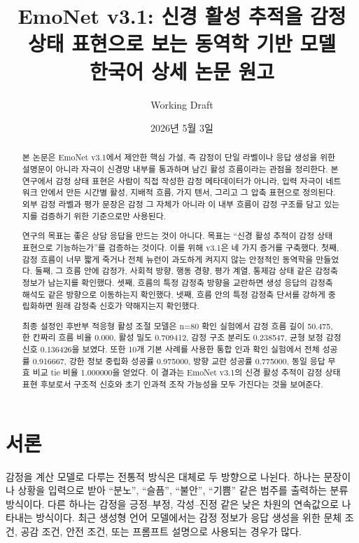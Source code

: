 \documentclass[11pt,a4paper]{article}
\title{\textbf{EmoNet v3.1: 신경 활성 추적을 감정 상태 표현으로 보는 동역학 기반 모델}\\
\large 한국어 상세 논문 원고}
\author{Working Draft}
\date{2026년 5월 3일}
\begin{document}
\maketitle

\begin{abstract}
본 논문은 EmoNet v3.1에서 제안한 핵심 가설, 즉 감정이 단일 라벨이나 응답 생성을 위한 설명문이 아니라 자극이 신경망 내부를 통과하며 남긴 활성 흐름이라는 관점을 정리한다. 본 연구에서 감정 상태 표현은 사람이 직접 작성한 감정 메타데이터가 아니라, 입력 자극이 네트워크 안에서 만든 시간별 활성, 지배적 흐름, 가지 텐서, 그리고 그 압축 표현으로 정의된다. 외부 감정 라벨과 평가 문장은 감정 그 자체가 아니라 이 내부 흐름이 감정 구조를 담고 있는지를 검증하기 위한 기준으로만 사용된다.

연구의 목표는 좋은 상담 응답을 만드는 것이 아니다. 목표는 ``신경 활성 추적이 감정 상태 표현으로 기능하는가''를 검증하는 것이다. 이를 위해 v3.1은 네 가지 증거를 구축했다. 첫째, 감정 흐름이 너무 짧게 죽거나 전체 뉴런이 과도하게 켜지지 않는 안정적인 동역학을 만들었다. 둘째, 그 흐름 안에 감정가, 사회적 방향, 행동 경향, 평가 계열, 통제감 상태 같은 감정축 정보가 남는지를 확인했다. 셋째, 흐름의 특정 감정축 방향을 교란하면 생성 응답의 감정축 해석도 같은 방향으로 이동하는지 확인했다. 넷째, 흐름 안의 특정 감정축 단서를 강하게 중립화하면 원래 감정축 신호가 약해지는지 확인했다.

최종 설정인 후반부 적응형 활성 조절 모델은 n=80 확인 실험에서 감정 흐름 길이 50.475, 한 칸짜리 흐름 비율 0.000, 활성 밀도 0.709412, 감정 구조 분리도 0.238547, 균형 보정 감정 신호 0.136426을 보였다. 또한 10개 기본 사례를 사용한 통합 인과 확인 실험에서 전체 성공률 0.916667, 강한 정보 중립화 성공률 0.975000, 방향 교란 성공률 0.775000, 동일 응답 무효 비교 tie 비율 1.000000을 얻었다. 이 결과는 EmoNet v3.1의 신경 활성 추적이 감정 상태 표현 후보로서 구조적 신호와 초기 인과적 조작 가능성을 모두 가진다는 것을 보여준다.
\end{abstract}

\tableofcontents
\newpage

\section{서론}

감정을 계산 모델로 다루는 전통적 방식은 대체로 두 방향으로 나뉜다. 하나는 문장이나 상황을 입력으로 받아 ``분노'', ``슬픔'', ``불안'', ``기쁨'' 같은 범주를 출력하는 분류 방식이다. 다른 하나는 감정을 긍정--부정, 각성--진정 같은 낮은 차원의 연속값으로 나타내는 방식이다. 최근 생성형 언어 모델에서는 감정 정보가 응답 생성을 위한 문체 조건, 공감 조건, 안전 조건, 또는 프롬프트 설명으로 사용되는 경우가 많다.
\end{document}
